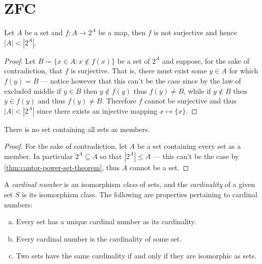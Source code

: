\section{ZFC}

\begin{theorem}[Cantor]
    \label{thm:cantor-power-set-theorem}
    Let \(A\) be a set and \(f: A \to 2^A\) be a map, then \(f\) is not surjective
    and hence \(|A| < |2^A|\).
\end{theorem}

\begin{proof}
    Let \(B \coloneq \{x \in A \colon x \notin f(x)\}\) be a set of \(2^A\) and
    suppose, for the sake of contradiction, that \(f\) is surjective. That is,
    there must exist some \(y \in A\) for which \(f(y) = B\) --- notice however that
    this can't be the case since by the law of excluded middle if \(y \in B\) then
    \(y \notin f(y)\) thus \(f(y) \neq B\), while if \(y \notin B\) then \(y \in
    f(y)\) and thus \(f(y) \neq B\). Therefore \(f\) cannot be surjective and thus
    \(|A| < |2^A|\) since there exists an injective mapping \(x \mapsto \{x\}\).
\end{proof}

\begin{theorem}
    \label{thm:no-set-contains-all-sets}
    There is no set containing all sets as members.
\end{theorem}

\begin{proof}
    For the sake of contradiction, let \(A\) be a set containing every set as a
    member. In particular \(2^A \subseteq A\) so that \(|2^A| \leq A\) --- this
    can't be the case by \cref{thm:cantor-power-set-theorem}, thus \(A\) cannot be a
    set.
\end{proof}

\begin{definition}
    \label{def:ordinal-cardinal}
    A \emph{cardinal number} is an isomorphism \emph{class} of sets, and the
    \emph{cardinality} of a given set \(S\) is its isomorphism class. The following
    are properties pertaining to cardinal numbers:
    \begin{enumerate}[(a)]\setlength\itemsep{0em}
        \item Every set has a unique cardinal number as its cardinality.
        \item Every cardinal number is the cardinality of some set.
        \item Two sets have the same cardinality if and only if they are isomorphic as
              sets.
    \end{enumerate}
\end{definition}

